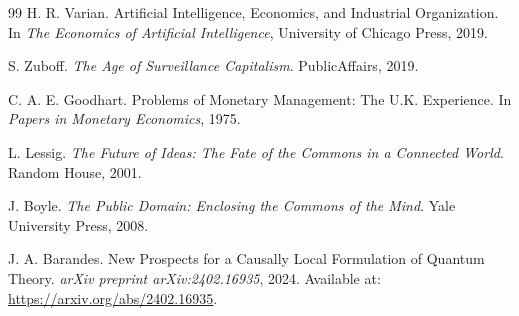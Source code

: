 \documentclass[12pt, oneside]{article}
\begin{document}
\begin{thebibliography}{99}
H. R. Varian.
\newblock Artificial Intelligence, Economics, and Industrial Organization.
\newblock In \emph{The Economics of Artificial Intelligence}, University of Chicago Press, 2019.

S. Zuboff.
\newblock \emph{The Age of Surveillance Capitalism}.
\newblock PublicAffairs, 2019.

C. A. E. Goodhart.
\newblock Problems of Monetary Management: The U.K. Experience.
\newblock In \emph{Papers in Monetary Economics}, 1975.

L. Lessig.
\newblock \emph{The Future of Ideas: The Fate of the Commons in a Connected World}.
\newblock Random House, 2001.

J. Boyle.
\newblock \emph{The Public Domain: Enclosing the Commons of the Mind}.
\newblock Yale University Press, 2008.

J. A. Barandes.
\newblock New Prospects for a Causally Local Formulation of Quantum Theory.
\newblock \emph{arXiv preprint arXiv:2402.16935}, 2024.
\newblock Available at: \url{https://arxiv.org/abs/2402.16935}.

\end{thebibliography}
\end{document}

